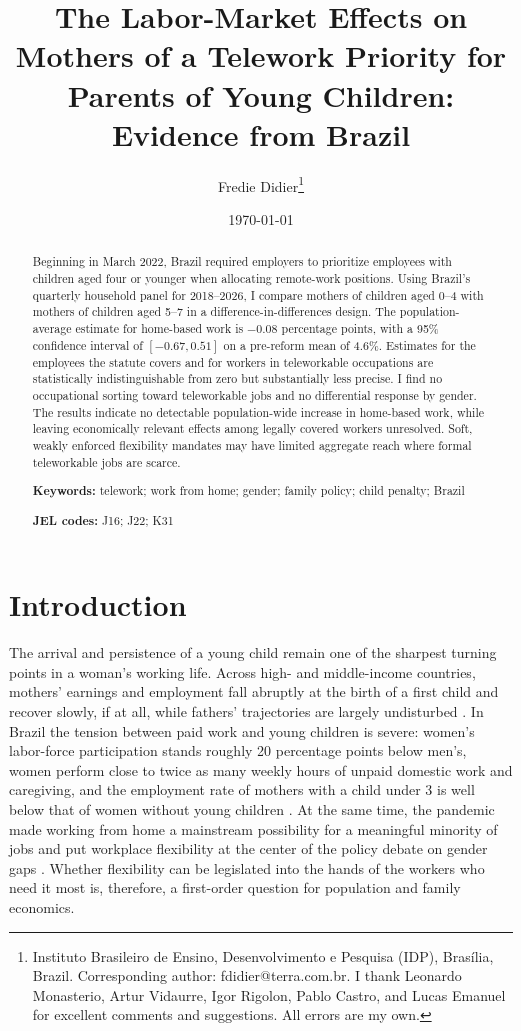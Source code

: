 \documentclass[12pt]{article}
\title{\textbf{The Labor-Market Effects on Mothers of a Telework Priority for Parents of Young Children: Evidence from Brazil}}
\author{Fredie Didier\thanks{Instituto Brasileiro de Ensino, Desenvolvimento e Pesquisa (IDP), Bras\'ilia, Brazil. Corresponding author: fdidier@terra.com.br. I thank Leonardo Monasterio, Artur Vidaurre, Igor Rigolon, Pablo Castro, and Lucas Emanuel for excellent comments and suggestions. All errors are my own.}}
\date{\today}
\begin{document}
\maketitle

\begin{abstract}
\noindent Beginning in March 2022, Brazil required employers to prioritize employees with children aged four or younger when allocating remote-work positions. Using Brazil's quarterly household panel for 2018--2026, I compare mothers of children aged 0--4 with mothers of children aged 5--7 in a difference-in-differences design. The population-average estimate for home-based work is $-0.08$ percentage points, with a 95\% confidence interval of $[-0.67, 0.51]$ on a pre-reform mean of 4.6\%. Estimates for the employees the statute covers and for workers in teleworkable occupations are statistically indistinguishable from zero but substantially less precise. I find no occupational sorting toward teleworkable jobs and no differential response by gender. The results indicate no detectable population-wide increase in home-based work, while leaving economically relevant effects among legally covered workers unresolved. Soft, weakly enforced flexibility mandates may have limited aggregate reach where formal teleworkable jobs are scarce.

\vspace{0.5em}
\noindent\textbf{Keywords:} telework; work from home; gender; family policy; child penalty; Brazil

\vspace{0.3em}
\noindent\textbf{JEL codes:} J16; J22; K31
\end{abstract}

\clearpage

\section{Introduction}

The arrival and persistence of a young child remain one of the sharpest turning points in a woman's working life. Across high- and middle-income countries, mothers' earnings and employment fall abruptly at the birth of a first child and recover slowly, if at all, while fathers' trajectories are largely undisturbed \citep{kleven2019denmark,kleven2019countries}. In Brazil the tension between paid work and young children is severe: women's labor-force participation stands roughly 20 percentage points below men's, women perform close to twice as many weekly hours of unpaid domestic work and caregiving, and the employment rate of mothers with a child under 3 is well below that of women without young children \citep{ibge_gender}. At the same time, the pandemic made working from home a mainstream possibility for a meaningful minority of jobs and put workplace flexibility at the center of the policy debate on gender gaps \citep{barrero2023,dingelneiman2020}. Whether flexibility can be legislated into the hands of the workers who need it most is, therefore, a first-order question for population and family economics.
\end{document}
